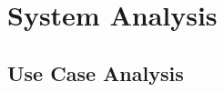 \chapter{System Analysis}
\label{chap:system-analysis}

\section{Use Case Analysis}
\label{sec:usecase-analysis}

